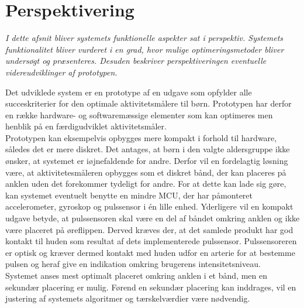 \section{Perspektivering}
\textit{I dette afsnit bliver systemets funktionelle aspekter sat i perspektiv. Systemets funktionalitet bliver vurderet i en grad, hvor mulige optimeringsmetoder bliver undersøgt og præsenteres. Desuden beskriver perspektiveringen eventuelle videreudviklinger af prototypen.}

Det udviklede system er en prototype af en udgave som opfylder alle succeskriterier for den optimale aktivitetsmålere til børn. Prototypen har derfor en række hardware- og softwaremæssige elementer som kan optimeres men henblik på en færdigudviklet aktivitetsmåler.\\
Prototypen kan eksempelvis opbygges mere kompakt i forhold til hardware, således det er mere diskret. Det antages, at børn i den valgte aldersgruppe ikke ønsker, at systemet er iøjnefaldende for andre. Derfor vil en fordelagtig løsning være, at aktivitetesmåleren opbygges som et diskret bånd, der kan placeres på anklen uden det forekommer tydeligt for andre. For at dette kan lade sig gøre, kan systemet eventuelt benytte en mindre MCU, der har påmonteret accelerometer, gyroskop og pulssensor i én lille enhed. Yderligere vil en kompakt udgave betyde, at pulssensoren skal være en del af båndet omkring anklen og ikke være placeret på øreflippen. Derved kræves der, at det samlede produkt har god kontakt til huden som resultat af dets implementerede pulssensor. Pulssensoreren er optisk og kræver dermed kontakt med huden udfor en arterie for at bestemme pulsen og heraf give en indikation omkring brugerens intensitetsniveau. \\
Systemet anses mest optimalt placeret omkring anklen i et bånd, men en sekundær placering er mulig. Førend en sekundær placering kan inddrages, vil en justering af systemets algoritmer og tærskelværdier være nødvendig. 

